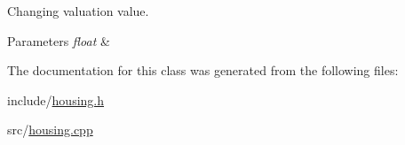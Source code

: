 Changing valuation value. 


\begin{DoxyParams}{Parameters}
{\em float} & \\
\hline
\end{DoxyParams}


The documentation for this class was generated from the following files\+:\begin{DoxyCompactItemize}
\item 
include/\hyperlink{housing_8h}{housing.\+h}\item 
src/\hyperlink{housing_8cpp}{housing.\+cpp}\end{DoxyCompactItemize}
